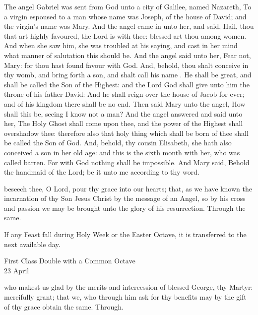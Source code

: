 The angel Gabriel was sent from God unto a city of Galilee, named Nazareth, To a virgin espoused to a man whose name was Joseph, of the house of David; and the virgin's name was Mary. And the angel came in unto her, and said, Hail, thou that art highly favoured, the Lord is with thee: blessed art thou among women. And when she saw him, she was troubled at his saying, and cast in her mind what manner of salutation this should be. And the angel said unto her, Fear not, Mary: for thou hast found favour with God. And, behold, thou shalt conceive in thy womb, and bring forth a son, and shalt call his name . He shall be great, and shall be called the Son of the Highest: and the Lord God shall give unto him the throne of his father David: And he shall reign over the house of Jacob for ever; and of his kingdom there shall be no end. Then said Mary unto the angel, How shall this be, seeing I know not a man? And the angel answered and said unto her, The Holy Ghost shall come upon thee, and the power of the Highest shall overshadow thee: therefore also that holy thing which shall be born of thee shall be called the Son of God. And, behold, thy cousin Elisabeth, she hath also conceived a son in her old age: and this is the sixth month with her, who was called barren. For with God nothing shall be impossible. And Mary said, Behold the handmaid of the Lord; be it unto me according to thy word. 

\postcommunion
{} beseech thee, O Lord, pour thy grace into our hearts; that, as we have known the incarnation of thy Son Jesus Christ by the message of an Angel, so by his cross and passion we may be brought unto the glory of his resurrection. Through the same.

\begin{rubric}
    If any Feast fall during Holy Week or the Easter Octave, it is transferred to the next available day.
\end{rubric}

\begin{inhead}
    {First Class Double with a Common Octave\\
23 April}
\end{inhead}

\collect
 who makest us glad by the merits and intercession of blessed George, thy Martyr: mercifully grant; that we, who through him ask for thy benefits may by the gift of thy grace obtain the same. Through.

